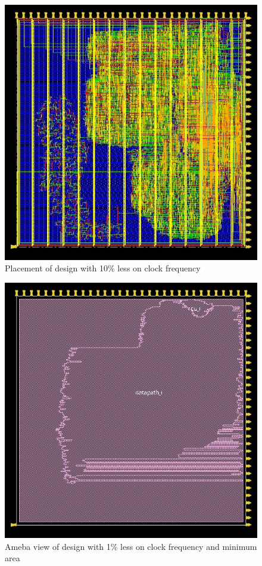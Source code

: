\begin{figure}[!htbp]
\centering
\captionsetup{justification=centering}
\includegraphics[scale=0.6,angle=0]{../project/physical_design/images_10/DLX_IR_SIZE32_PC_SIZE32_10_place_prerouting.jpg}
\caption{Placement of design with 10\% less on clock frequency}
\label{fig:plac10}
\end{figure}



\begin{figure}[!htbp]
\centering
\captionsetup{justification=centering}
\includegraphics[scale=0.6,angle=0]{../project/physical_design/images_1_minarea/DLX_IR_SIZE32_PC_SIZE32_1_minarea_ameba_prerouting.jpg}
\caption{Ameba view of design with 1\% less on clock frequency and minimum area}
\label{fig:ameba1minarea}
\end{figure}


